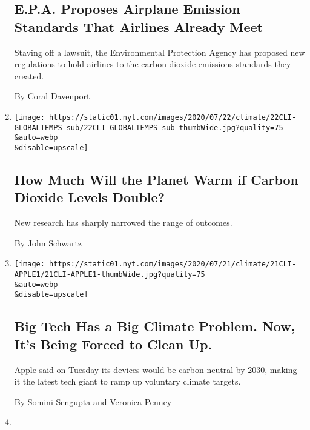 \begin{enumerate}
  \hypertarget{epa-proposes-airplane-emission-standards-that-airlines-already-meet}{%
  \subsection{E.P.A. Proposes Airplane Emission Standards That Airlines
  Already
  Meet}\label{epa-proposes-airplane-emission-standards-that-airlines-already-meet}}

  Staving off a lawsuit, the Environmental Protection Agency has
  proposed new regulations to hold airlines to the carbon dioxide
  emissions standards they created.

  By Coral Davenport
\item
  \href{/2020/07/22/climate/global-warming-temperature-range.html}{}

  \texttt{[image: https://static01.nyt.com/images/2020/07/22/climate/22CLI-GLOBALTEMPS-sub/22CLI-GLOBALTEMPS-sub-thumbWide.jpg?quality=75\\\&auto=webp\\\&disable=upscale]}

  \hypertarget{how-much-will-the-planet-warm-if-carbon-dioxide-levels-double}{%
  \subsection{How Much Will the Planet Warm if Carbon Dioxide Levels
  Double?}\label{how-much-will-the-planet-warm-if-carbon-dioxide-levels-double}}

  New research has sharply narrowed the range of outcomes.

  By John Schwartz
\item
  \href{/2020/07/21/climate/apple-emissions-pledge.html}{}

  \texttt{[image: https://static01.nyt.com/images/2020/07/21/climate/21CLI-APPLE1/21CLI-APPLE1-thumbWide.jpg?quality=75\\\&auto=webp\\\&disable=upscale]}

  \hypertarget{big-tech-has-a-big-climate-problem-now-its-being-forced-to-clean-up}{%
  \subsection{Big Tech Has a Big Climate Problem. Now, It's Being Forced
  to Clean
  Up.}\label{big-tech-has-a-big-climate-problem-now-its-being-forced-to-clean-up}}

  Apple said on Tuesday its devices would be carbon-neutral by 2030,
  making it the latest tech giant to ramp up voluntary climate targets.

  By Somini Sengupta and Veronica Penney
\item
  \href{/2020/07/21/climate/investors-climate-threat-regulators.html}{}


\end{enumerate}
